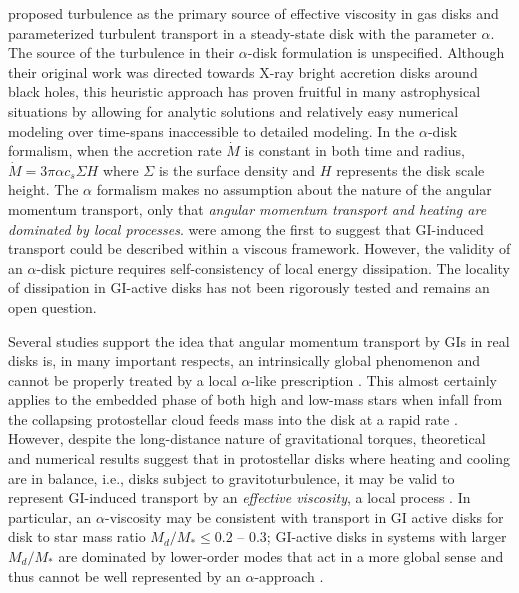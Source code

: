 \documentclass[manuscript]{aastex}
\begin{document}
\citet{shakura1973} proposed turbulence as the primary source of effective viscosity in gas disks
and parameterized turbulent transport in a steady-state disk with the  parameter $\alpha$.  The source of the 
turbulence in their $\alpha$-disk formulation is unspecified. Although their original work was directed towards X-ray bright
accretion disks around black holes, this heuristic approach has proven fruitful in many astrophysical situations by allowing for analytic solutions and relatively easy numerical modeling over time-spans inaccessible to detailed modeling. In the 
$\alpha$-disk formalism, when the accretion rate $\dot{M}$ is constant in both time and radius, $\dot{M} = 3\pi\alpha c_s \Sigma H$ where $\Sigma$ is the surface density and $H$ represents
the disk scale height. The $\alpha$ formalism makes no assumption about the nature of the angular momentum transport, only that {\it angular momentum transport
and heating are dominated by local processes}. \citet{lin1987,lin1990} were among the first to suggest
that GI-induced transport could be described within a viscous
framework.  However, the  validity of an $\alpha$-disk picture requires self-consistency of local energy dissipation. 
The locality of dissipation in GI-active disks has not been rigorously tested and remains an open question. 

Several studies support the idea that angular momentum transport by GIs in real disks is, in many important respects, an intrinsically global phenomenon and cannot be properly treated by a local $\alpha$-like prescription \citep{laughlin1996, balbus1999, lodato2005, mejia2005, boley2006, cai2008}.  This almost certainly applies to the embedded phase of both high and low-mass stars when infall from the collapsing protostellar cloud feeds mass into the disk at a rapid
rate \citep[e.g.]{yorke1993, laughlin1994, yorke1999,vorobyov2005,vorobyov2006}.  
However, despite the long-distance nature of gravitational torques, theoretical and numerical results suggest that in protostellar disks where heating and cooling are in balance, i.e., disks subject to gravitoturbulence,
 it may be valid to represent GI-induced transport by an {\it effective viscosity}, a local process \citep{gammie2001, lodato2004, rice2005, cossins2009, vorobyov2010}.  In particular, 
an $\alpha$-viscosity may be consistent
with transport in GI active disks for disk to star mass ratio $M_d/M_* \le 0.2$ -- 0.3; GI-active disks
in systems with larger $M_d/M_*$ are dominated by lower-order modes that act in a more global sense and thus cannot be well represented by an $\alpha$-approach
\citep{lodato2004, cossins2009, vorobyov2010}.
\end{document}

